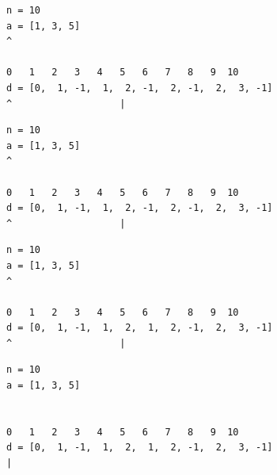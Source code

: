 \begin{frame}[fragile]
\begin{verbatim}
n = 10
a = [1, 3, 5]
^

0   1   2   3   4   5   6   7   8   9  10
d = [0,  1, -1,  1,  2, -1,  2, -1,  2,  3, -1]
^                   |
\end{verbatim}
\end{frame}
\addtocounter{framenumber}{-1}

\begin{frame}[fragile]
\begin{verbatim}
n = 10
a = [1, 3, 5]
^

0   1   2   3   4   5   6   7   8   9  10
d = [0,  1, -1,  1,  2, -1,  2, -1,  2,  3, -1]
^                   |
\end{verbatim}
\end{frame}
\addtocounter{framenumber}{-1}

\begin{frame}[fragile]
\begin{verbatim}
n = 10
a = [1, 3, 5]
^

0   1   2   3   4   5   6   7   8   9  10
d = [0,  1, -1,  1,  2,  1,  2, -1,  2,  3, -1]
^                   |
\end{verbatim}
\end{frame}
\addtocounter{framenumber}{-1}

\begin{frame}[fragile]
\begin{verbatim}
n = 10
a = [1, 3, 5]


0   1   2   3   4   5   6   7   8   9  10
d = [0,  1, -1,  1,  2,  1,  2, -1,  2,  3, -1]
|
\end{verbatim}
\end{frame}

